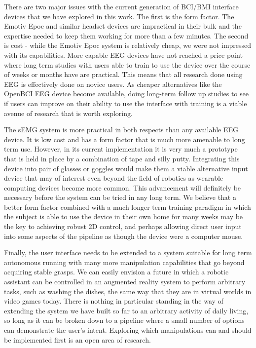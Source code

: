There are two major issues with the current generation of BCI/BMI interface devices that we have explored in this work. The first is the form factor. The Emotiv Epoc and similar headset devices are impractical in their bulk and the expertise needed to keep them working for more than a few minutes. The second is cost - while the Emotiv Epoc system is relatively cheap, we were not impressed with its capabilities. More capable EEG devices have not reached a price point where long term studies with users able to train to use the device over the course of weeks or months have are practical.  This means that all research done using EEG is effectively done on novice users. As cheaper alternatives like the OpenBCI EEG device become available, doing long-term follow up studies to see if users can improve on their ability to use the interface with training is a viable avenue of research that is worth exploring.  

The sEMG system is more practical in both respects than any available EEG device. It is low cost and has a form factor that is much more amenable to long term use. However, in its current implementation it is very much a prototype that is held in place by a combination of tape and silly putty. Integrating this device into pair of glasses or goggles would make them a viable alternative input device that may of interest even beyond the field of robotics as wearable computing devices become more common. This advancement will definitely be necessary before the system can be tried in any long term. We believe that a better form factor combined with a much longer term training paradigm in which the subject is able to use the device in their own home for many weeks may be the key to achieving robust 2D control, and perhaps allowing direct user input into some aspects of the pipeline as though the device were a computer mouse.  

Finally, the user interface needs to be extended to a system suitable for long term autonomous running with many more manipulation capabilities that go beyond acquiring stable grasps. We can easily envision a future in which a robotic assistant can be controlled in an augmented reality system to perform arbitrary tasks, such as washing the dishes, the same way that they are in virtual worlds in video games today. There is nothing in particular standing in the way of extending the system we have built so far to an arbitrary activity of daily living, so long as it can be broken down to a pipeline where a small number of options can demonstrate the user's intent. Exploring which manipulations can and should be implemented first is an open area of research. 

